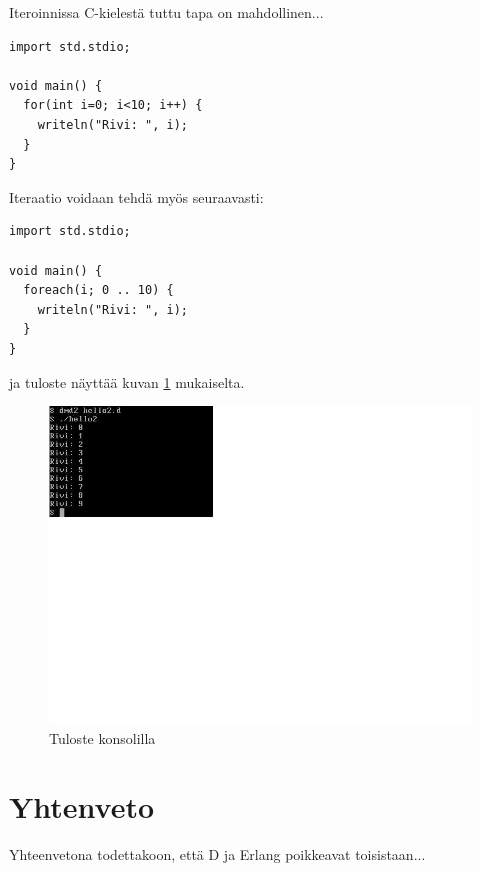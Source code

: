 \documentclass[11pt,oneside,a4paper]{article}
\begin{document}
Iteroinnissa C-kielestä tuttu tapa on mahdollinen...

\begin{verbatim}
import std.stdio;

void main() {
  for(int i=0; i<10; i++) {
    writeln("Rivi: ", i);
  }
}
\end{verbatim}
Iteraatio voidaan tehdä myös seuraavasti:
\begin{verbatim}
import std.stdio;

void main() {
  foreach(i; 0 .. 10) {
    writeln("Rivi: ", i);
  }
}
\end{verbatim}

ja tuloste näyttää kuvan \ref{konsoli1} mukaiselta.
\begin{figure}[tbh]
\begin{center}
\includegraphics[width=1.0\textwidth]{konsoli1.jpg}
\caption{Tuloste konsolilla}
\label{konsoli1}
\end{center}
\end{figure}

\section{Yhtenveto}
Yhteenvetona todettakoon, että D ja Erlang poikkeavat toisistaan...
\end{document}

